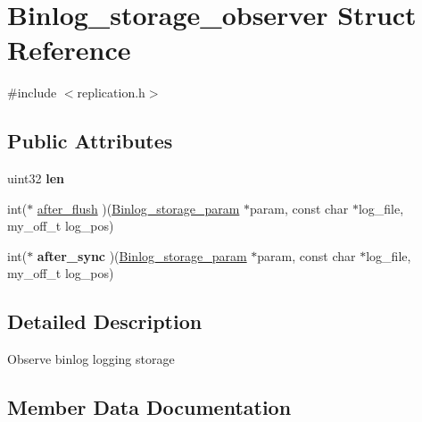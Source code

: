 \hypertarget{structBinlog__storage__observer}{}\section{Binlog\+\_\+storage\+\_\+observer Struct Reference}
\label{structBinlog__storage__observer}


{\ttfamily \#include $<$replication.\+h$>$}

\subsection*{Public Attributes}
\begin{DoxyCompactItemize}
\item 
\mbox{\label{structBinlog__storage__observer_a75f972538596a72550fa4c05aac3c082}} 
uint32 {\bfseries len}
\item 
int($\ast$ \mbox{\hyperlink{structBinlog__storage__observer_a5814cdea84ad0dc9785075aaa9dd4950}{after\+\_\+flush}} )(\mbox{\hyperlink{structBinlog__storage__param}{Binlog\+\_\+storage\+\_\+param}} $\ast$param, const char $\ast$log\+\_\+file, my\+\_\+off\+\_\+t log\+\_\+pos)
\item 
\mbox{\label{structBinlog__storage__observer_ae7a07dc578b5a47aec28dab465dfe005}} 
int($\ast$ {\bfseries after\+\_\+sync} )(\mbox{\hyperlink{structBinlog__storage__param}{Binlog\+\_\+storage\+\_\+param}} $\ast$param, const char $\ast$log\+\_\+file, my\+\_\+off\+\_\+t log\+\_\+pos)
\end{DoxyCompactItemize}


\subsection{Detailed Description}
Observe binlog logging storage 

\subsection{Member Data Documentation}
\mbox{\label{structBinlog__storage__observer_a5814cdea84ad0dc9785075aaa9dd4950}} 
